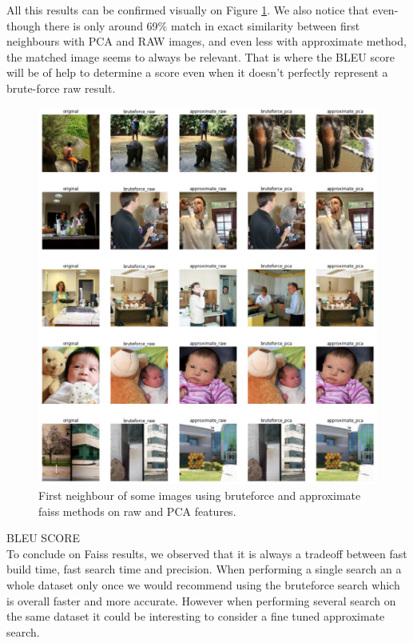 \documentclass[a4paper]{article}
\begin{document}
All this results can be confirmed visually on Figure \ref{fig:visual-faiss}. We also notice that even-though there is only around 69\% match in exact similarity between first neighbours with PCA and RAW images, and even less with approximate method, the matched image seems to always be relevant. That is where the BLEU score will be of help to determine a score even when it doesn't perfectly represent a brute-force raw result. \\

\begin{figure}[h]
	\includegraphics[width=\textwidth]{visual-faiss}
	\caption{First neighbour of some images using bruteforce and approximate faiss methods on raw and PCA features.}
	\label{fig:visual-faiss}
\end{figure}

BLEU SCORE \\

To conclude on Faiss results, we observed that it is always a tradeoff between fast build time, fast search time and precision. When performing a single search an a whole dataset only once we would recommend using the bruteforce search which is overall faster and more accurate. However when performing several search on the same dataset it could be interesting to consider a fine tuned approximate search.
\end{document}
